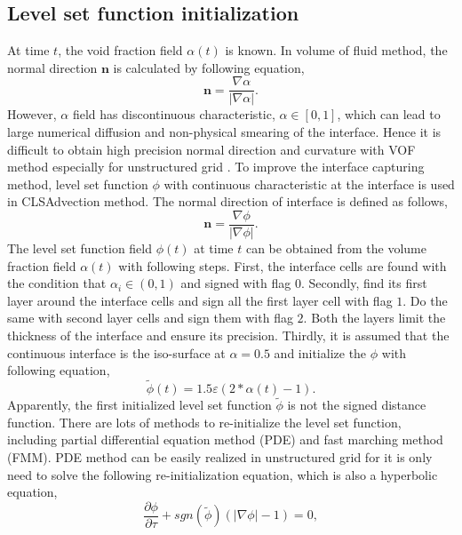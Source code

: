 \subsection{Level set function initialization}
At time $t$, the void fraction field $\alpha(t)$ is known. In volume of fluid method, the normal direction $\mathbf{n}$ is calculated by following equation,
\begin{equation}\label{27}
  \mathbf{n}=\frac{\nabla{\alpha}}{\left|\nabla{\alpha}\right|}.
\end{equation}
However, $\alpha$ field has discontinuous characteristic, $\alpha\in[0,1]$, which can lead to large numerical diffusion and non-physical smearing of the interface. Hence it is difficult to obtain high precision normal direction and curvature with VOF method especially for unstructured grid \cite{cao2018coupled}. To improve the interface capturing method, level set function $\phi$ with continuous characteristic at the interface is used in CLSAdvection method. The normal direction of interface is defined as follows,
\begin{equation}\label{20}
\mathbf{n}=\frac{\nabla\phi}{\left|\nabla\phi\right|}.
\end{equation}
The level set function field $\phi(t)$ at time $t$ can be obtained from the volume fraction field $\alpha(t)$ with following steps. First, the interface cells are found with the condition that $\alpha_i\in(0,1)$ and signed with flag $0$. Secondly, find its first layer around the interface cells and sign all the first layer cell with flag $1$. Do the same with second layer cells and sign them with flag $2$. Both the layers limit the thickness of the interface and ensure its precision. Thirdly, it is assumed that the continuous interface is the iso-surface at $\alpha=0.5$ and initialize the $\phi$ with following equation,
\begin{equation}\label{28}
\tilde{\phi}(t)=1.5\varepsilon(2*\alpha(t)-1).
\end{equation}
Apparently, the first initialized level set function $\tilde{\phi}$ is not the signed distance function. There are lots of methods to re-initialize the level set function, including partial differential equation method (PDE) and fast marching method (FMM). PDE method can be easily realized in unstructured grid for it is only need to solve the following re-initialization equation, which is also a hyperbolic equation,
\begin{equation}\label{11}
\frac{\partial\phi}{\partial\tau}+sgn(\tilde{\phi})(\left|\nabla\phi\right|-1)=0,
\end{equation}
